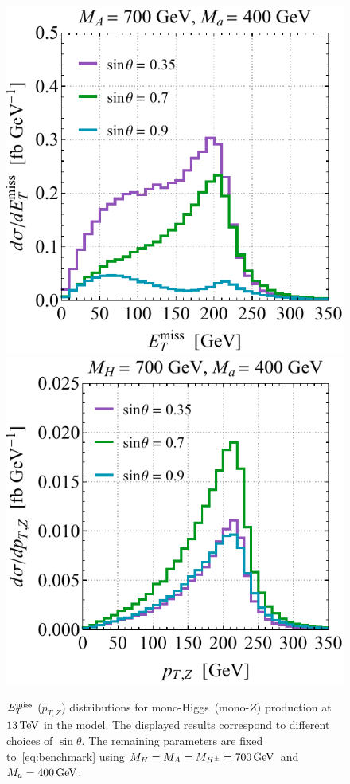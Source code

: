 \begin{figure}[t!]
\centering
\includegraphics[height=0.45\textwidth]{texinputs/04_grid/newfigures/svarl.pdf} \qquad 
\includegraphics[height=0.45\textwidth]{texinputs/04_grid/newfigures/svarr.pdf}
\vspace{2mm}
\caption{\label{fig:svar} $E_T^\mathrm{miss}$ ($p_{T,Z}$) distributions for mono-Higgs~(mono-$Z$) production at $13 \, {\rm TeV}$  in the \hdma model. The displayed results correspond to different choices of $\sin \theta$. The remaining parameters are fixed to~\eqref{eq:benchmark} using $M_{H} = M_{A} = M_{H^{\pm}} = 700 \, {\rm GeV}$ and $M_{a} = 400 \, {\rm GeV}$. }
\end{figure}

